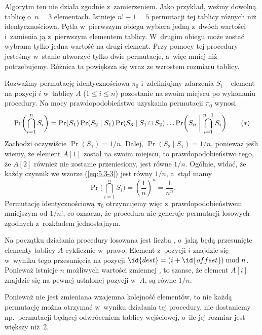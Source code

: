 \exercise %

\noindent Algorytm ten nie działa zgodnie z~zamierzeniem. Jako przykład, weźmy dowolną tablicę o~$n=3$ elementach. Istnieje $n!-1=5$ permutacji tej tablicy różnych niż identycznościowa. Pętla  w~pierwszym obiegu wybiera jedną z~dwóch wartości i~zamienia ją z~pierwszym elementem tablicy. W~drugim obiegu może zostać wybrana tylko jedna wartość na drugi element. Przy pomocy tej procedury jesteśmy w~stanie utworzyć tylko dwie permutacje, a~więc mniej niż potrzebujemy. Różnica ta powiększa się wraz ze wzrostem rozmiaru tablicy.

\exercise %
Rozważmy permutację identycznościową $\pi_0$ i~zdefiniujmy zdarzenia $S_i$ -- element na pozycji $i$ w~tablicy $A$ ($1\le i\le n$) pozostanie na swoim miejscu po wykonaniu procedury. Na mocy  prawdopodobieństwo uzyskania permutacji $\pi_0$ wynosi
\[
	\Pr\biggl(\bigcap_{i=1}^nS_i\biggr) = \Pr(S_1)\Pr(S_2\mid S_1)\Pr(S_3\mid S_1\cap S_2)\dots\Pr\biggl(S_n\biggm|\bigcap_{i=1}^{n-1}S_i\biggr) \tag{$*$}\label{eq:5.3-3}
\]
Zachodzi oczywiście $\Pr(S_1)=1/n$. Dalej, $\Pr(S_2\mid S_1)=1/n$, ponieważ jeśli wiemy, że element $A[1]$ został na swoim miejscu, to prawdopodobieństwo tego, że $A[2]$ również nie zostanie przeniesiony, jest równe $1/n$. Ogólnie, widać, że każdy czynnik we wzorze (\ref{eq:5.3-3}) jest równy $1/n$, a~stąd mamy
\[
	\Pr\biggl(\bigcap_{i=1}^nS_i\biggr) = \left(\frac{1}{n}\right)^n = \frac{1}{n^n}.
\]
Permutację identycznościową $\pi_0$ otrzymujemy więc z~prawdopodobieństwem mniejszym od $1/n!$, co oznacza, że procedura  nie generuje permutacji losowych zgodnych z~rozkładem jednostajnym.

\exercise %
Na początku działania procedury losowana jest liczba , o~jaką będą przesunięte elementy tablicy $A$ cyklicznie w~prawo. Element z~pozycji $i$ znajdzie się w~wyniku tego przesunięcia na pozycji $\id{dest}=(i+\id{offset})\bmod n$. Ponieważ istnieje $n$ możliwych wartości zmiennej , to szanse, że element $A[i]$ znajdzie się na pewnej ustalonej pozycji w~$A$, są równe $1/n$.

Ponieważ nie jest zmieniana wzajemna kolejność elementów, to nie każdą permutację można otrzymać w~wyniku działania tej procedury, nie dostaniemy np.\ permutacji będącej odwróceniem tablicy wejściowej, o~ile jej rozmiar jest większy niż~2.

